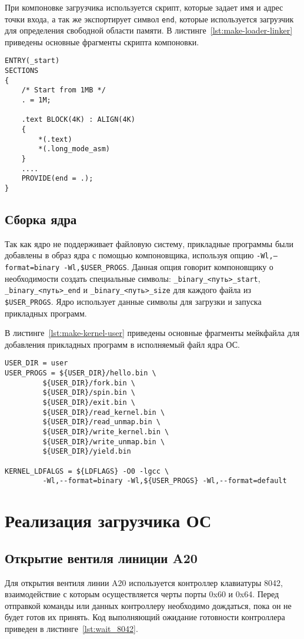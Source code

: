 При компоновке загрузчика используется скрипт, которые задает имя и адрес точки входа, а так
же экспортирует символ \texttt{end}, которые используется загрузчик для определения свободной
области памяти. В листинге~\ref{lst:make-loader-linker} приведены основные фрагменты скрипта компоновки.

\begin{lstlisting}[language=Make, caption={Фрагменты скрипта компоновки}, label={lst:make-loader-linker}]
ENTRY(_start)
SECTIONS
{
	/* Start from 1MB */
	. = 1M;

	.text BLOCK(4K) : ALIGN(4K)
	{
		*(.text)
		*(.long_mode_asm)
	}
	....
	PROVIDE(end = .);
}
\end{lstlisting}


\subsection{Сборка ядра}
Так как ядро не поддерживает файловую систему, прикладные программы были добавлены в образ ядра
с помощью компоновщика, используя опцию \texttt{-Wl,--format=binary -Wl,\${USER\_PROGS}}. Данная
опция говорит компоновщику о необходимости создать специальные символы: \texttt{\_binary\_<путь>\_start},
\texttt{\_binary\_<путь>\_end} и \texttt{\_binary\_<путь>\_size} для каждого файла из \texttt{\${USER\_PROGS}}.
Ядро использует данные символы для загрузки и запуска прикладных программ.

В листинге~\ref{lst:make-kernel-user} приведены основные фрагменты мейкфайла для добавления
прикладных программ в исполняемый файл ядра ОС.

\begin{lstlisting}[language=Make, caption={Фрагмент мейкфайла для добавления бинарных файлов}, label={lst:make-kernel-user}]
USER_DIR = user
USER_PROGS = ${USER_DIR}/hello.bin \
	     ${USER_DIR}/fork.bin \
	     ${USER_DIR}/spin.bin \
	     ${USER_DIR}/exit.bin \
	     ${USER_DIR}/read_kernel.bin \
	     ${USER_DIR}/read_unmap.bin \
	     ${USER_DIR}/write_kernel.bin \
	     ${USER_DIR}/write_unmap.bin \
	     ${USER_DIR}/yield.bin

KERNEL_LDFALGS = ${LDFLAGS} -O0 -lgcc \
		 -Wl,--format=binary -Wl,${USER_PROGS} -Wl,--format=default
\end{lstlisting}

\section{Реализация загрузчика ОС}
\subsection{Открытие вентиля линиции A20}
Для открытия вентиля линии A20 используется контроллер клавиатуры 8042, взаимодействие с которым
осуществляется черты порты 0x60 и 0x64. Перед отправкой команды или данных контроллеру необходимо дождаться, пока
он не будет готов их принять. Код выполняющий ожидание готовности контроллера приведен в листинге~\ref{lst:wait_8042}.

